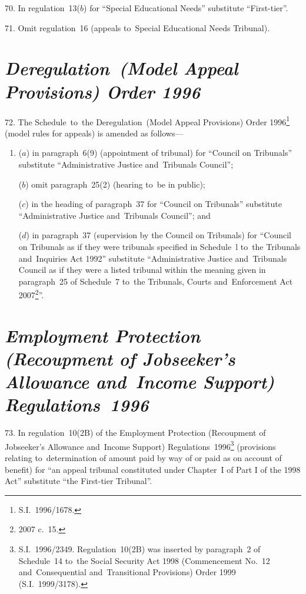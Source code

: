 \documentclass[12pt,a4paper]{article}
\begin{document}
\medskip

70.  In regulation~13($b$)  for “Special Educational Needs” substitute “First-tier”.

\medskip

71.  Omit regulation~16 (appeals to~Special Educational Needs Tribunal).

\section*{\itshape Deregulation~(Model Appeal Provisions) Order 1996}

72.  The Schedule~to~the Deregulation~(Model Appeal Provisions) Order 1996\footnote{S.I.~1996/1678.} (model rules for appeals) is amended as follows—
\begin{enumerate}\item[]
($a$) in paragraph~6(9) (appointment of tribunal) for “Council on Tribunals” substitute “Administrative Justice and~Tribunals Council”;

($b$) omit paragraph~25(2) (hearing to~be in public);

($c$) in the heading of paragraph~37 for “Council on Tribunals” substitute “Administrative Justice and~Tribunals Council”; and

($d$) in paragraph~37 (supervision by the Council on Tribunals) for “Council on Tribunals as if they were tribunals specified in Schedule~l to~the Tribunals and~Inquiries Act 1992” substitute “Administrative Justice and~Tribunals Council as if they were a listed tribunal within the meaning given in paragraph~25 of Schedule~7 to~the Tribunals, Courts and~Enforcement Act 2007\footnote{2007 c.~15.}”.
\end{enumerate}

\section*{\itshape Employment Protection (Recoupment of Jobseeker’s Allowance and~Income Support) Regulations~1996}

73.  In regulation~10(2B) of the Employment Protection (Recoupment of Jobseeker’s Allowance and~Income Support) Regulations~1996\footnote{S.I.~1996/2349. Regulation~10(2B) was inserted by paragraph~2 of Schedule~14 to~the Social Security Act 1998 (Commencement No.~12 and~Consequential and~Transitional Provisions) Order 1999 (S.I.~1999/3178).} (provisions relating to~determination of amount paid by way of or paid as on account of benefit) for “an appeal tribunal constituted under Chapter~I of Part I of the 1998 Act” substitute “the First-tier Tribunal”.
\end{document}
